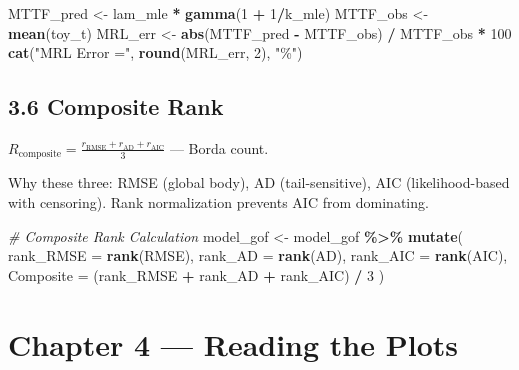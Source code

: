 \documentclass[
]{article}
\newenvironment{Shaded}{\begin{snugshade}}{\end{snugshade}}
\newcommand{\AttributeTok}[1]{\textcolor[rgb]{0.13,0.29,0.53}{#1}}
\newcommand{\CommentTok}[1]{\textcolor[rgb]{0.56,0.35,0.01}{\textit{#1}}}
\newcommand{\DecValTok}[1]{\textcolor[rgb]{0.00,0.00,0.81}{#1}}
\newcommand{\FunctionTok}[1]{\textcolor[rgb]{0.13,0.29,0.53}{\textbf{#1}}}
\newcommand{\NormalTok}[1]{#1}
\newcommand{\OtherTok}[1]{\textcolor[rgb]{0.56,0.35,0.01}{#1}}
\newcommand{\SpecialCharTok}[1]{\textcolor[rgb]{0.81,0.36,0.00}{\textbf{#1}}}
\newcommand{\StringTok}[1]{\textcolor[rgb]{0.31,0.60,0.02}{#1}}
\begin{document}
\begin{Shaded}
\begin{Highlighting}[]
\NormalTok{MTTF\_pred }\OtherTok{\textless{}{-}}\NormalTok{ lam\_mle }\SpecialCharTok{*} \FunctionTok{gamma}\NormalTok{(}\DecValTok{1} \SpecialCharTok{+} \DecValTok{1}\SpecialCharTok{/}\NormalTok{k\_mle)}
\NormalTok{MTTF\_obs  }\OtherTok{\textless{}{-}} \FunctionTok{mean}\NormalTok{(toy\_t)}
\NormalTok{MRL\_err   }\OtherTok{\textless{}{-}} \FunctionTok{abs}\NormalTok{(MTTF\_pred }\SpecialCharTok{{-}}\NormalTok{ MTTF\_obs) }\SpecialCharTok{/}\NormalTok{ MTTF\_obs }\SpecialCharTok{*} \DecValTok{100}
\FunctionTok{cat}\NormalTok{(}\StringTok{"MRL Error ="}\NormalTok{, }\FunctionTok{round}\NormalTok{(MRL\_err, }\DecValTok{2}\NormalTok{), }\StringTok{"\%"}\NormalTok{)}
\end{Highlighting}
\end{Shaded}

\subsection{3.6 Composite Rank}\label{composite-rank}

\(R_{\text{composite}} = \frac{r_{\text{RMSE}} + r_{\text{AD}} + r_{\text{AIC}}}{3}\)
--- Borda count.

Why these three: RMSE (global body), AD (tail-sensitive), AIC
(likelihood-based with censoring). Rank normalization prevents AIC from
dominating.

\begin{Shaded}
\begin{Highlighting}[]
\CommentTok{\# Composite Rank Calculation}
\NormalTok{model\_gof }\OtherTok{\textless{}{-}}\NormalTok{ model\_gof }\SpecialCharTok{\%\textgreater{}\%}
  \FunctionTok{mutate}\NormalTok{(}
    \AttributeTok{rank\_RMSE =} \FunctionTok{rank}\NormalTok{(RMSE),}
    \AttributeTok{rank\_AD   =} \FunctionTok{rank}\NormalTok{(AD),}
    \AttributeTok{rank\_AIC  =} \FunctionTok{rank}\NormalTok{(AIC),}
    \AttributeTok{Composite =}\NormalTok{ (rank\_RMSE }\SpecialCharTok{+}\NormalTok{ rank\_AD }\SpecialCharTok{+}\NormalTok{ rank\_AIC) }\SpecialCharTok{/} \DecValTok{3}
\NormalTok{  )}
\end{Highlighting}
\end{Shaded}

\newpage

\section{Chapter 4 --- Reading the
Plots}\label{chapter-4-reading-the-plots}
\end{document}
